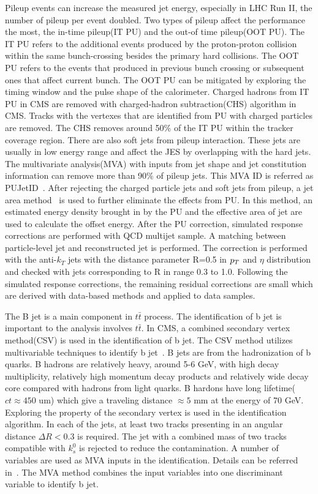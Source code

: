 Pileup events can increase the measured jet energy, especially in LHC Run II, the number of pileup per event doubled. Two types of pileup affect the performance the most, the in-time pileup(IT PU) and the out-of time pileup(OOT PU). The IT PU refers to the additional events produced by the proton-proton collision within the same bunch-crossing besides the primary hard collisions. The OOT PU refers to the events that produced in previous bunch crossing or subsequent ones that affect current bunch. The OOT PU can be mitigated by exploring the timing window and the pulse shape of the calorimeter. Charged hadrons from IT PU in CMS are removed with charged-hadron subtraction(CHS) algorithm in CMS. Tracks with the vertexes that are identified from PU with charged particles are removed. The CHS removes around 50\% of the IT PU within the tracker coverage region. There are also soft jets from pileup interaction. These jets are usually in low energy range and affect the JES by overlapping with the hard jets. The multivariate analysis(MVA) with inputs from jet shape and jet constitution information can remove more than 90\% of pileup jets. This MVA ID is referred as PUJetID~\cite{PU_jetID}. After rejecting the charged particle jets and soft jets from pileup, a jet area method~\cite{FastJetalso} is used to further eliminate the effects from PU. In this method, an estimated energy density brought in by the PU and the effective area of jet are used to calculate the offset energy. After the PU correction, simulated response corrections are performed with QCD multijet sample. A matching between particle-level jet and reconstructed jet is performed. The correction is performed with the anti-$k_{T}$ jets with the distance parameter R=0.5 in $p_{T}$ and $
\eta$ distribution and checked with jets corresponding to R in range 0.3 to 1.0. Following the simulated response corrections, the remaining residual corrections are small which are derived with data-based methods and applied to data samples.


The B jet is a main component in $t\bar{t}$ process. The identification of b jet is important to the analysis involves $t\bar{t}$. In CMS,  a combined secondary vertex method(CSV) is used in the identification of b jet. The CSV method utilizes multivariable techniques to identify b jet~\cite{BTV-16-002}. B jets are from the hadronization of b quarks. B hadrons are relatively heavy, around 5-6 GeV, with high decay multiplicity, relatively high momentum decay products and relatively wide decay core compared with hadrons from light quarks. B hardons have long lifetime($ct\approx450$ um) which give a traveling distance $\approx5$ mm at the energy of 70 GeV. Exploring the property of the secondary vertex is used in the identification algorithm. In each of the jets, at least two tracks presenting in an angular distance $\Delta R <0.3$ is required. The jet with a combined mass of two tracks compatible with $k_{s}^{0}$ is rejected to reduce the contamination. A number of variables are used as MVA inputs in the identification. Details can be referred in~\cite{BTV-16-002}.  The MVA method combines the input variables into one discriminant variable to identify b jet.



